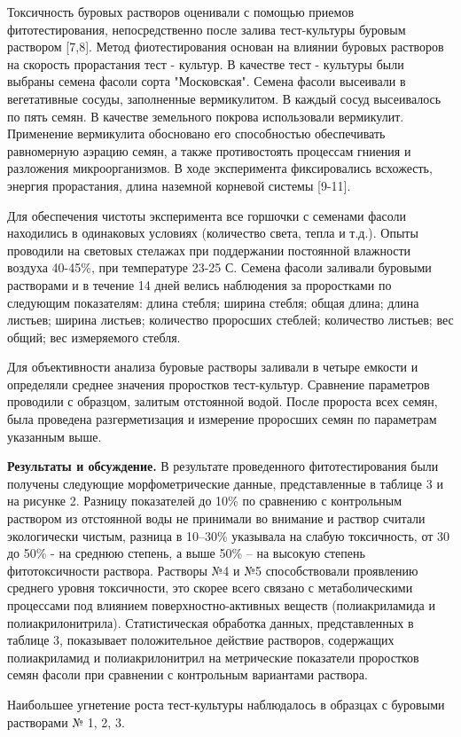 \begin{multicols}{2}
Токсичность буровых растворов оценивали с помощью приемов
фитотестирования, непосредственно после залива тест-культуры буровым
раствором {[}7,8{]}. Метод фиотестирования основан на влиянии буровых
растворов на скорость прорастания тест - культур. В качестве тест -
культуры были выбраны семена фасоли сорта "Московская". Семена фасоли
высеивали в вегетативные сосуды, заполненные вермикулитом. В каждый
сосуд высеивалось по пять семян. В качестве земельного покрова
использовали вермикулит. Применение вермикулита обосновано его
способностью обеспечивать равномерную аэрацию семян, а также
противостоять процессам гниения и разложения микроорганизмов. В ходе
эксперимента фиксировались всхожесть, энергия прорастания, длина
наземной корневой системы {[}9-11{]}.

Для обеспечения чистоты эксперимента все горшочки с семенами фасоли
находились в одинаковых условиях (количество света, тепла и т.д.). Опыты
проводили на световых стелажах при поддержании постоянной влажности
воздуха 40-45\%, при температуре 23-25 С. Семена
фасоли заливали буровыми растворами и в течение 14 дней велись
наблюдения за проростками по следующим показателям: длина стебля; ширина
стебля; общая длина; длина листьев; ширина листьев; количество проросших
стеблей; количество листьев; вес общий; вес измеряемого стебля.

Для объективности анализа буровые растворы заливали в четыре емкости и
определяли среднее значения проростков тест-культур. Сравнение
параметров проводили с образцом, залитым отстоянной водой. После
пророста всех семян, была проведена разгерметизация и измерение
проросших семян по параметрам указанным выше.

{\bfseries Результаты и обсуждение.} В результате проведенного
фитотестирования были получены следующие морфометрические данные,
представленные в таблице 3 и на рисунке 2. Разницу показателей до 10\%
по сравнению с контрольным раствором из отстоянной воды не принимали во
внимание и раствор считали экологически чистым, разница в 10--30\%
указывала на слабую токсичность, от 30 до 50\% - на среднюю степень, а
выше 50\% -- на высокую степень фитотоксичности раствора. Растворы №4 и
№5 способствовали проявлению среднего уровня токсичности, это скорее
всего связано с метаболическими процессами под влиянием
поверхностно-активных веществ (полиакриламида и полиакрилонитрила).
Статистическая обработка данных, представленных в таблице 3, показывает
положительное действие растворов, содержащих полиакриламид и
полиакрилонитрил на метрические показатели проростков семян фасоли при
сравнении с контрольным вариантами раствора.

Наибольшее угнетение роста тест-культуры наблюдалось в образцах с
буровыми растворами № 1, 2, 3.
\end{multicols}

